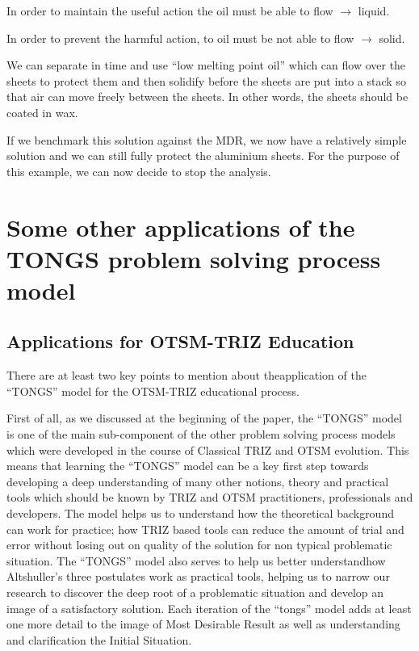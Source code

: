 \documentclass[11pt,a4paper]{article}
\begin{document}
In order to maintain the useful action the oil must be able to flow $\to$
liquid.

In order to prevent the harmful action, to oil must be not able to flow $\to$
solid.

We can separate in time and use “low melting point oil” which can flow over
the sheets to protect them and then solidify before the sheets are put into a
stack so that air can move freely between the sheets. In other words, the
sheets should be coated in wax.

If we benchmark this solution against the MDR, we now have a relatively simple
solution and we can still fully protect the aluminium sheets. For the purpose
of this example, we can now decide to stop the analysis.

\section{Some other applications of the TONGS problem solving process model}

\subsection{Applications for OTSM-TRIZ Education}

There are at least two key points to mention about theapplication of the
“TONGS” model for the OTSM-TRIZ educational process.

First of all, as we discussed at the beginning of the paper, the “TONGS” model
is one of the main sub-component of the other problem solving process models
which were developed in the course of Classical TRIZ and OTSM evolution. This
means that learning the “TONGS” model can be a key first step towards
developing a deep understanding of many other notions, theory and practical
tools which should be known by TRIZ and OTSM practitioners, professionals and
developers.  The model helps us to understand how the theoretical background
can work for practice; how TRIZ based tools can reduce the amount of trial and
error without losing out on quality of the solution for non typical
problematic situation.  The “TONGS” model also serves to help us better
understandhow Altshuller’s three postulates work as practical tools, helping
us to narrow our research to discover the deep root of a problematic situation
and develop an image of a satisfactory solution.  Each iteration of the
“tongs” model adds at least one more detail to the image of Most Desirable
Result as well as understanding and clarification the Initial Situation.
\end{document}
